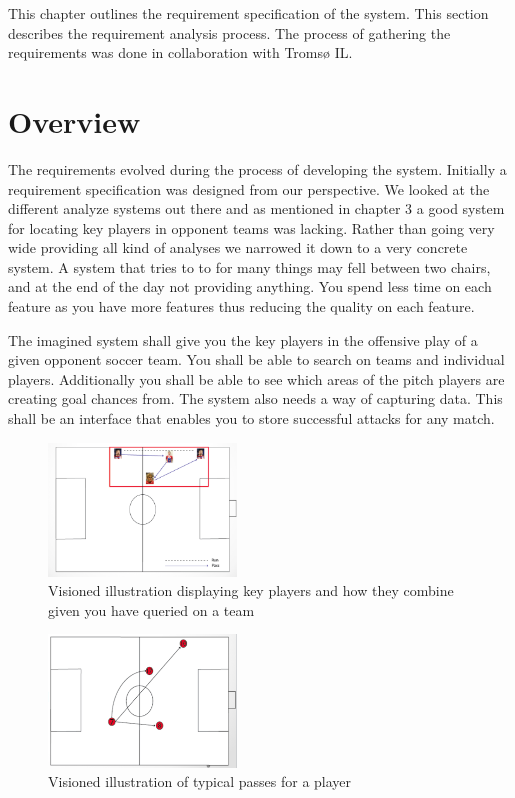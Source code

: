 This chapter outlines the requirement specification of the system. This section describes the requirement analysis process. The process of gathering the requirements was done in collaboration with Tromsø IL.

\section{Overview}

The requirements evolved during the process of developing the system. Initially a requirement specification was designed from our perspective. We looked at the different analyze systems out there and as mentioned in chapter 3 a good system for locating key players in opponent teams was lacking. Rather than going very wide providing all kind of analyses we narrowed it down to a very concrete system. A system that tries to to for many things may fell between two chairs, and at the end of the day not providing anything. You spend less time on each feature as you have more features thus reducing the quality on each feature.

The imagined system shall give you the key players in the offensive play of a given opponent soccer team. You shall be able to search on teams and individual players. Additionally you shall be able to see which areas of the pitch players are creating goal chances from. The system also needs a way of capturing data. This shall be an interface that enables you to store successful attacks for any match.

\begin{figure}[ht!]
\centering
\includegraphics[width=50mm]{images/general/illustration_after_search.png}
\caption{Visioned illustration displaying key players and how they combine given you have queried on a team}
\label{overflow}
\end{figure}

\begin{figure}[ht!]
\centering
\includegraphics[width=50mm]{images/general/illustration_after_search2.png}
\caption{Visioned illustration of typical passes for a player}
\label{overflow}
\end{figure}

